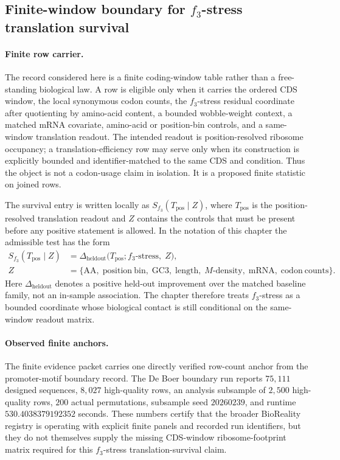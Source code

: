 
\subsection{Finite-window boundary for $f_3$-stress translation survival}
\label{sec:bioreality-f3-stress-position-resolved-translation-survival}

\paragraph{Finite row carrier.}
The record considered here is a finite coding-window table rather than a free-standing biological law.  A row is eligible only when it carries the ordered CDS window, the local synonymous codon counts, the $f_3$-stress residual coordinate after quotienting by amino-acid content, a bounded wobble-weight context, a matched mRNA covariate, amino-acid or position-bin controls, and a same-window translation readout.  The intended readout is position-resolved ribosome occupancy; a translation-efficiency row may serve only when its construction is explicitly bounded and identifier-matched to the same CDS and condition.  Thus the object is not a codon-usage claim in isolation.  It is a proposed finite statistic on joined rows.

The survival entry is written locally as $S_{f_3}(T_{\mathrm{pos}}\mid Z)$, where $T_{\mathrm{pos}}$ is the position-resolved translation readout and $Z$ contains the controls that must be present before any positive statement is allowed.  In the notation of this chapter the admissible test has the form
$$
\begin{aligned}
S_{f_3}(T_{\mathrm{pos}}\mid Z)
  &= \Delta_{\mathrm{heldout}}\bigl(T_{\mathrm{pos}};
      f_3\text{-stress},\; Z\bigr), \\
Z
  &= \{\mathrm{AA},\;\mathrm{position\ bin},\;\mathrm{GC3},\;\mathrm{length},\;M\text{-density},\;\mathrm{mRNA},\;\mathrm{codon\ counts}\}.
\end{aligned}
$$
Here $\Delta_{\mathrm{heldout}}$ denotes a positive held-out improvement over the matched baseline family, not an in-sample association.  The chapter therefore treats $f_3$-stress as a bounded coordinate whose biological contact is still conditional on the same-window readout matrix.

\paragraph{Observed finite anchors.}
The finite evidence packet carries one directly verified row-count anchor from the promoter-motif boundary record.  The De Boer boundary run reports $75{,}111$ designed sequences, $8{,}027$ high-quality rows, an analysis subsample of $2{,}500$ high-quality rows, $200$ actual permutations, subsample seed $20260239$, and runtime $530.4038379192352$ seconds.  These numbers certify that the broader BioReality registry is operating with explicit finite panels and recorded run identifiers, but they do not themselves supply the missing CDS-window ribosome-footprint matrix required for this $f_3$-stress translation-survival claim.

